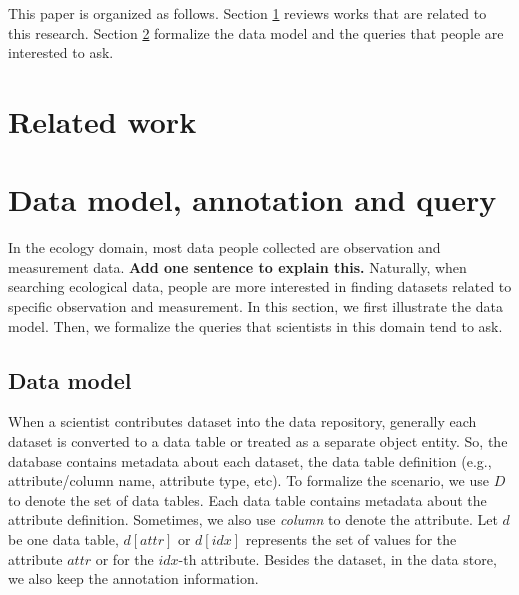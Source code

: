 \documentclass[conference]{IEEEtran}
\newcommand{\from}[2]{{\bf[{\sc from #1:} #2]}}
\begin{document}
This paper is organized as follows. 
Section \ref{sec:relatedwork} reviews works that are related to this
research. Section \ref{sec:dataquery} formalize the data model and the
queries that people are interested to ask. 

\section{Related work}\label{sec:relatedwork}



\section{Data model, annotation and query}\label{sec:dataquery}

In the ecology domain, most data people collected are observation and
measurement data. {\bf Add one sentence to explain this.}
Naturally, when searching ecological data, people are more interested in finding datasets
related to specific observation and measurement. 
In this section, we first illustrate the data model. Then, we
formalize the queries that scientists in this domain tend to ask. 

\subsection{Data model}

When a scientist contributes dataset into the data repository, generally
each dataset is converted to a data table\cite{tdar} or treated as a separate
object entity\cite{knb}. 
So, the database contains metadata about each dataset, the data table
definition (e.g., attribute/column name, attribute type, etc). 
To formalize the scenario, we use $D$ to denote the set of data
tables. Each data table contains metadata about the attribute
definition.  Sometimes, we also use {\em column} to denote the attribute. 
Let $d$ be one data table, 
$d[attr]$ or $d[idx]$ represents the set of values for the attribute
$attr$ or for the $idx$-th attribute. 
Besides the dataset, in the data store, we also keep the annotation
information. 
\end{document}
